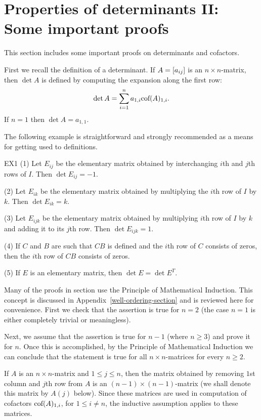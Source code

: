 \section{Properties of determinants II: Some important proofs } \label{sec:determinant-proofs}

This section includes some important proofs on determinants and cofactors.

First we recall the definition of a determinant. If $A=\left[a_{ij} \right]$ is an $n\times n$-matrix, then $\det A$ is defined by computing the expansion along the first row:
\begin{equation}
\label{E1} 
\det A=\sum_{i=1}^n a_{1,i} \mbox{\rm cof}(A)_{1,i}. 
\end{equation}
If $n=1$ then $\det A=a_{1,1}$. 

The following example is straightforward and strongly recommended as a means for
getting used to definitions. 

\begin{example}{}{EX1}
(1) Let $E_{ij}$ be the elementary matrix obtained by interchanging $i$th and $j$th rows of $I$. 
Then $\det E_{ij}=-1$. 

(2) Let $E_{ik}$ be the elementary matrix obtained by multiplying the $i$th row of $I$ by $k$. 
Then $\det E_{ik}=k$. 

(3) Let $E_{ijk}$ be the elementary matrix obtained by multiplying $i$th row of $I$ by $k$ and 
adding it to its $j$th row. Then $\det E_{ijk}=1$. 

(4) If $C$ and $B$ are such that $CB$ is defined and the $i$th row of $C$ consists of zeros, 
then the $i$th row of $CB$ consists of zeros. 

(5) If $E$ is an elementary matrix, then $\det E=\det E^T$. 
\end{example} 

Many of the proofs in section use the Principle of Mathematical Induction. This concept is discussed in Appendix~\ref{well-ordering-section} and is reviewed here for convenience.
First we check that the assertion is true for $n=2$ (the case $n=1$ is either completely trivial
or meaningless). 

Next, we assume that the assertion is true for $n-1$ (where $n\geq 3$) and prove it for $n$. 
Once this is accomplished, by the Principle of Mathematical Induction we can conclude that the 
statement is true for all $n\times n$-matrices for every $n\geq 2$. 

If $A$ is an $n\times n$-matrix and $1\leq j \leq n$,
then the matrix obtained by removing $1$st column and $j$th row from $A$ 
is an $(n-1)\times (n-1)$-matrix (we shall denote this matrix by $A(j)$ below). Since these matrices 
are used in computation of cofactors $\mbox{\rm cof}(A)_{1,i}$, for $1\leq i\neq n$, 
the inductive assumption applies to these matrices. 


